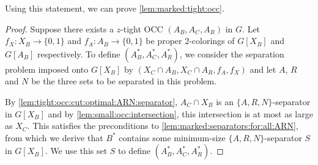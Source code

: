 %
Using this statement, we can prove \cref{lem:marked:tight:occ}.
%
\lemMarkedTightOcc*
\begin{proof}
	Suppose there exists a $z$-tight OCC $(A_B, A_C, A_R)$ in $G$. Let $f_X \colon X_B \rightarrow \{0,1\}$ and $f_A \colon A_B \rightarrow \{0,1\}$ be proper $2$-colorings of $G[X_B]$ and $G[A_B]$ respectively. To define $(A_B^\ast, A_C^\ast, A_R^\ast)$, we consider the separation problem imposed onto $G[X_B]$ by $(X_C \cap A_B, X_C \cap A_R, f_A, f_X)$ and let $A$, $R$ and $N$ be the three sets to be separated in this problem. 
	
	By \cref{lem:tight:occ:cut:optimal:ARN:separator}, $A_C \cap X_B$ is an $\{A, R, N\}$-separator in $G[X_B]$ and by \cref{lem:small:occ:intersection}, this intersection is at most as large as $X_C$. This satisfies the preconditions to \cref{lem:marked:separators:for:all:ARN}, from which we derive that $B^\ast$ contains some minimum-size $\{A, R, N\}$-separator $S$ in $G[X_B]$. We use this set $S$ to define $(A_B^\ast, A_C^\ast, A_R^\ast)$.
	

\end{proof}

